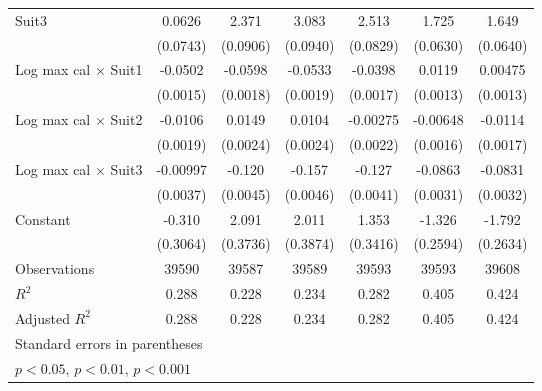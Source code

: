 {\begin{tabular}{l*{6}{c}}
\addlinespace
Suit3               &      0.0626         &       2.371\sym{***}&       3.083\sym{***}&       2.513\sym{***}&       1.725\sym{***}&       1.649\sym{***}\\
                    &    (0.0743)         &    (0.0906)         &    (0.0940)         &    (0.0829)         &    (0.0630)         &    (0.0640)         \\
\addlinespace
Log max cal $\times$ Suit1&     -0.0502\sym{***}&     -0.0598\sym{***}&     -0.0533\sym{***}&     -0.0398\sym{***}&      0.0119\sym{***}&     0.00475\sym{***}\\
                    &    (0.0015)         &    (0.0018)         &    (0.0019)         &    (0.0017)         &    (0.0013)         &    (0.0013)         \\
\addlinespace
Log max cal $\times$ Suit2&     -0.0106\sym{***}&      0.0149\sym{***}&      0.0104\sym{***}&    -0.00275         &    -0.00648\sym{***}&     -0.0114\sym{***}\\
                    &    (0.0019)         &    (0.0024)         &    (0.0024)         &    (0.0022)         &    (0.0016)         &    (0.0017)         \\
\addlinespace
Log max cal $\times$ Suit3&    -0.00997\sym{**} &      -0.120\sym{***}&      -0.157\sym{***}&      -0.127\sym{***}&     -0.0863\sym{***}&     -0.0831\sym{***}\\
                    &    (0.0037)         &    (0.0045)         &    (0.0046)         &    (0.0041)         &    (0.0031)         &    (0.0032)         \\
\addlinespace
Constant            &      -0.310         &       2.091\sym{***}&       2.011\sym{***}&       1.353\sym{***}&      -1.326\sym{***}&      -1.792\sym{***}\\
                    &    (0.3064)         &    (0.3736)         &    (0.3874)         &    (0.3416)         &    (0.2594)         &    (0.2634)         \\
\midrule
Observations        &       39590         &       39587         &       39589         &       39593         &       39593         &       39608         \\
\(R^{2}\)           &       0.288         &       0.228         &       0.234         &       0.282         &       0.405         &       0.424         \\
Adjusted \(R^{2}\)  &       0.288         &       0.228         &       0.234         &       0.282         &       0.405         &       0.424         \\
\bottomrule
\multicolumn{7}{l}{\footnotesize Standard errors in parentheses}\\
\multicolumn{7}{l}{\footnotesize \sym{*} \(p<0.05\), \sym{**} \(p<0.01\), \sym{***} \(p<0.001\)}\\
\end{tabular}
}
